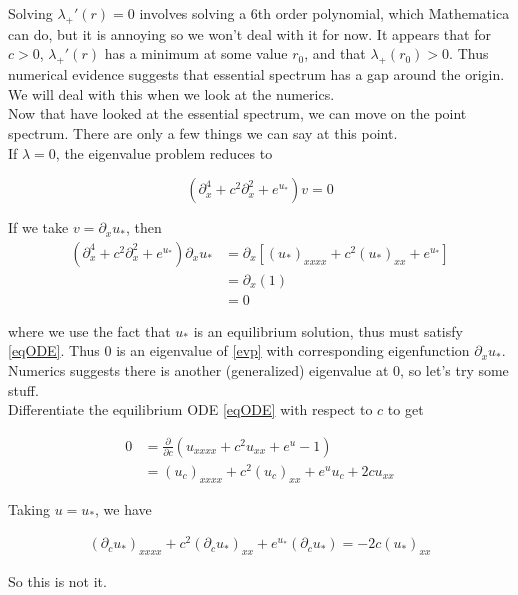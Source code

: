 \documentclass[12pt]{article}
\begin{document}
Solving $\lambda_+'(r) = 0$ involves solving a 6th order polynomial, which Mathematica can do, but it is annoying so we won't deal with it for now. It appears that for $c > 0$, $\lambda_+'(r)$ has a minimum at some value $r_0$, and that $\lambda_+(r_0) > 0$. Thus numerical evidence suggests that essential spectrum has a gap around the origin. We will deal with this when we look at the numerics.\\

Now that have looked at the essential spectrum, we can move on the point spectrum. There are only a few things we can say at this point.\\

If $\lambda = 0$, the eigenvalue problem reduces to

\begin{equation*}
(\partial_x^4 + c^2 \partial_x^2 + e^{u_*})v = 0
\end{equation*}

If we take $v = \partial_x u_*$, then 
\begin{align*}
(\partial_x^4 + c^2 \partial_x^2 + e^{u_*})\partial_x u_* 
&= \partial_x[(u_*)_{xxxx} + c^2 (u_*)_{xx} + e^{u_*}] \\
&= \partial_x(1) \\
&= 0
\end{align*}

where we use the fact that $u_*$ is an equilibrium solution, thus must satisfy \eqref{eqODE}. Thus 0 is an eigenvalue of \eqref{evp} with corresponding eigenfunction $\partial_x u_*$.\\

Numerics suggests there is another (generalized) eigenvalue at 0, so let's try some stuff.\\

Differentiate the equilibrium ODE \eqref{eqODE} with respect to $c$ to get

\begin{align*}
0 &= \frac{\partial}{\partial c}( u_{xxxx} + c^2 u_{xx} + e^{u} - 1 )\\
&= (u_c)_{xxxx} + c^2 (u_c)_{xx} + e^u u_c + 2 c u_{xx}
\end{align*}

Taking $u = u_*$, we have

\begin{align*}
(\partial_c u_*)_{xxxx} + c^2 (\partial_c u_*)_{xx} 
+ e^{u_*} (\partial_c u_*) = -2 c (u_*)_{xx}
\end{align*}

So this is not it.
\end{document}
